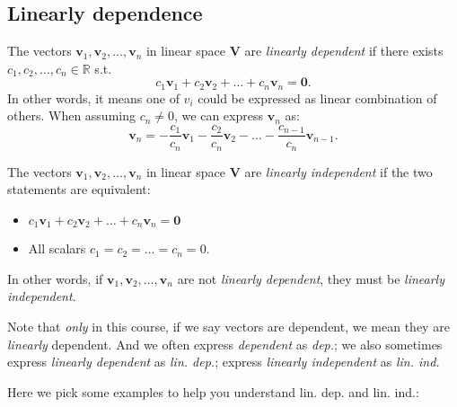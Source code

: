 \subsection{Linearly dependence}
\begin{definition}
The vectors $\bm v_1,\bm v_2,\dots,\bm v_n$ in linear space $\bm V$ are \emph{linearly dependent} if there exists $c_1,c_2,\dots,c_n\in\mathbb{R}$ s.t.
\[
c_1\bm v_1+c_2\bm v_2 +\dots+c_n\bm v_n = \bm 0.
\]
In other words, it means one of $v_i$ could be expressed as linear combination of others. When assuming $c_n\ne 0$, we can express $\bm v_n$ as:
\[
\bm v_n = -\frac{c_1}{c_n}\bm v_1-\frac{c_2}{c_n}\bm v_2 -\dots-\frac{c_{n-1}}{c_n}\bm v_{n-1}.
\]
\end{definition}
\begin{definition}
The vectors $\bm v_1,\bm v_2,\dots,\bm v_n$ in linear space $\bm V$ are \emph{linearly independent} if the two statements are equivalent:
\begin{itemize}
\item
$c_1\bm v_1+c_2\bm v_2 +\dots+c_n\bm v_n = \bm 0$
\item
All scalars $c_1=c_2=\dots=c_n=0$.
\end{itemize}
In other words, if $\bm v_1,\bm v_2,\dots,\bm v_n$ are not \emph{linearly dependent}, they must be \emph{linearly independent}.
\end{definition}
\begin{remark}
Note that \emph{only} in this course, if we say vectors are dependent, we mean they are \emph{linearly} dependent. And we often express \textit{dependent} as \textit{dep.}; we also sometimes express \textit{linearly dependent} as \textit{lin. dep.}; express \textit{linearly independent} as \textit{lin. ind.}
\end{remark}
Here we pick some examples to help you understand lin. dep. and lin. ind.:
\newpage
